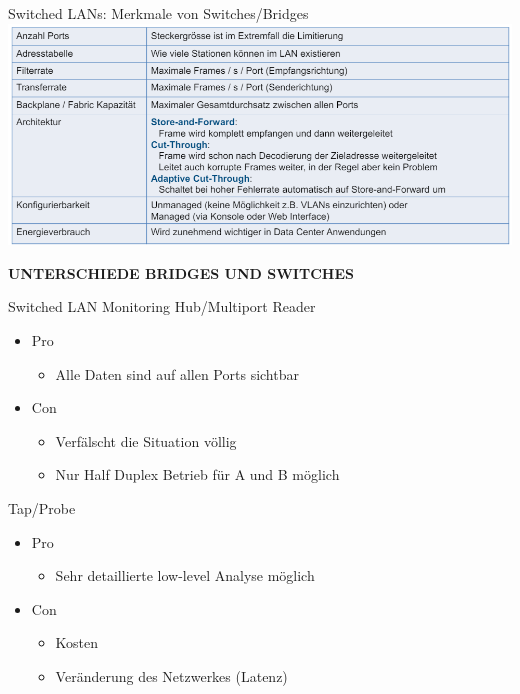 \begin{theorem}{Switched LANs: Merkmale von Switches/Bridges}\\
        \includegraphics[width=1\linewidth]{images/merkmale_switches_bridges.png}
\end{theorem}

\textbf{UNTERSCHIEDE BRIDGES UND SWITCHES}

\begin{concept}{Switched LAN Monitoring}
    Hub/Multiport Reader
    \begin{itemize}
        \item Pro
        \begin{itemize}
            \item Alle Daten sind auf allen Ports sichtbar
        \end{itemize}
        \item Con
        \begin{itemize}
            \item Verfälscht die Situation völlig
            \item Nur Half Duplex Betrieb für A und B möglich
        \end{itemize}
    \end{itemize}
    Tap/Probe
    \begin{itemize}
        \item Pro
        \begin{itemize}
            \item Sehr detaillierte low-level Analyse möglich
        \end{itemize}
        \item Con
        \begin{itemize}
            \item Kosten
            \item Veränderung des Netzwerkes (Latenz)
        \end{itemize}
    \end{itemize}
\end{concept}

